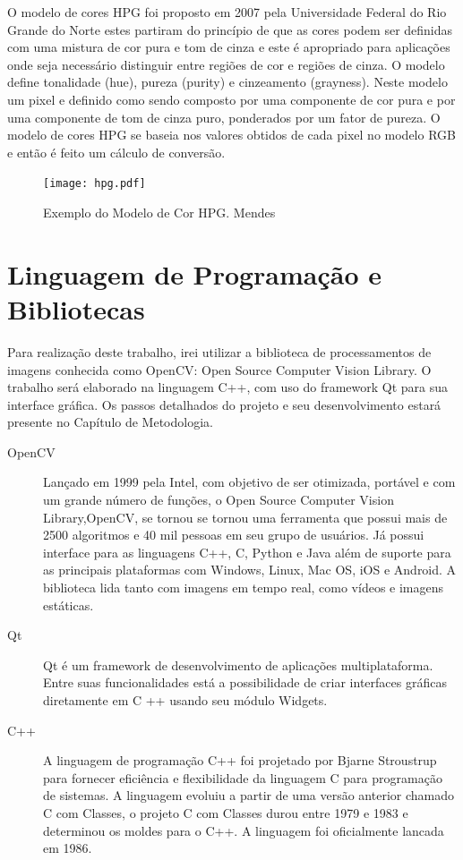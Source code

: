 O modelo de cores HPG foi proposto em 2007 pela Universidade Federal do Rio Grande do Norte estes partiram do princípio de que as cores podem ser definidas com uma mistura de cor pura e tom de cinza\cite{Martins:2007} e este é apropriado para aplicações onde seja necessário distinguir entre regiões de cor e regiões de cinza\cite{Mendes:2008}. O modelo define tonalidade (hue), pureza (purity) e cinzeamento (grayness). Neste modelo um pixel e definido como sendo composto por uma componente de cor pura e por uma componente de tom de cinza puro, ponderados por um fator de pureza\cite{Mendes:2008}.
O modelo de cores HPG se baseia nos valores obtidos de cada pixel no modelo RGB e então é feito um cálculo de conversão.
\begin{figure}[!h]
	\centering
	\texttt{[image: hpg.pdf]}
	\caption{Exemplo do Modelo de Cor HPG.  Mendes \cite{Mendes:2008}}
	\label{ModeloHPG}
\end{figure} 
\newpage
\section{Linguagem de Programação e Bibliotecas}


Para realização deste trabalho, irei utilizar a biblioteca de processamentos de imagens conhecida como OpenCV: Open Source Computer Vision Library. O trabalho será elaborado na linguagem C++, com uso do framework Qt para sua interface gráfica.
Os passos detalhados do projeto e seu desenvolvimento estará presente no Capítulo de Metodologia.
\begin{description}
	\item[OpenCV] Lançado em 1999 pela Intel\cite{Culjak:2012}, com objetivo de ser otimizada, portável e com um grande número de funções, o Open Source Computer Vision Library,OpenCV, se tornou se tornou uma ferramenta que possui mais de 2500 algoritmos e 40 mil pessoas em seu grupo de usuários\cite{Culjak:2012}. Já possui interface para as linguagens C++, C, Python e Java além de suporte para as principais plataformas com Windows, Linux, Mac OS, iOS e Android. A biblioteca lida tanto com imagens em tempo real, como vídeos e imagens estáticas.
	
	\item[Qt] Qt é um framework de desenvolvimento de aplicações multiplataforma. Entre suas funcionalidades está a possibilidade de criar interfaces gráficas diretamente em C ++ usando seu módulo Widgets.
	
	\item [C++] A linguagem de programação C++ foi projetado por Bjarne Stroustrup para fornecer eficiência e flexibilidade da linguagem C para programação de sistemas. A linguagem evoluiu a partir de uma versão anterior chamado C com Classes, o projeto C com Classes durou entre 1979 e 1983 e determinou os moldes para o C++. A linguagem foi oficialmente lancada em 1986.\cite{Stroustrup:1996} 
\end{description}



